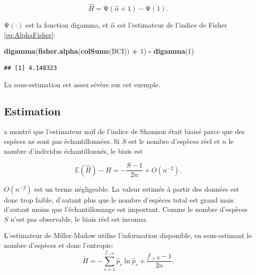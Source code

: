 \documentclass[
  11pt,
  american,
  a4paper,
  extrafontsizes,onecolumn,openright
  ]{memoir}
\newenvironment{Shaded}{\begin{snugshade}}{\end{snugshade}}
\newcommand{\DecValTok}[1]{\textcolor[rgb]{0.00,0.00,0.81}{#1}}
\newcommand{\FunctionTok}[1]{\textcolor[rgb]{0.13,0.29,0.53}{\textbf{#1}}}
\newcommand{\NormalTok}[1]{#1}
\newcommand{\SpecialCharTok}[1]{\textcolor[rgb]{0.81,0.36,0.00}{\textbf{#1}}}
\begin{document}
\begin{equation}
  \label{eq:Bulmer1974}
  \hat{H} 
  = \mathrm{\Psi} \left( \hat{\alpha} + 1 \right) - \mathrm{\Psi} \left( 1 \right).
\end{equation}

\(\mathrm{\Psi}(\cdot)\) est la fonction digamma, et \(\hat{\alpha}\) est l'estimateur de l'indice de Fisher \eqref{eq:AlphaFisher}:

\scriptsize

\begin{Shaded}
\begin{Highlighting}[]
\FunctionTok{digamma}\NormalTok{(}\FunctionTok{fisher.alpha}\NormalTok{(}\FunctionTok{colSums}\NormalTok{(BCI)) }\SpecialCharTok{+} \DecValTok{1}\NormalTok{) }\SpecialCharTok{{-}} \FunctionTok{digamma}\NormalTok{(}\DecValTok{1}\NormalTok{)}
\end{Highlighting}
\end{Shaded}

\begin{verbatim}
## [1] 4.148323
\end{verbatim}

\normalsize

La sous-estimation est assez sévère sur cet exemple.

\subsection{Estimation}\label{sec-BiaisShannon}

\textcite{Basharin1959} a montré que l'estimateur naïf de l'indice de Shannon était biaisé parce que des espèces ne sont pas échantillonnées.
Si \(S\) est le nombre d'espèces réel et \(n\) le nombre d'individus échantillonnés, le biais est

\begin{equation}
  \label{eq:Basharin1959}
  \mathbb{E}\left( \hat{H} \right) - H 
  = -\frac{S - 1}{2n} + O\left(n^{-2}\right).
\end{equation}

\(O(n^{-2})\) est un terme négligeable.
La valeur estimée à partir des données est donc trop faible, d'autant plus que le nombre d'espèces total est grand mais d'autant moins que l'échantillonnage est important.
Comme le nombre d'espèces \(S\) n'est pas observable, le biais réel est inconnu.

L'estimateur de Miller-Madow \autocite{Miller1955} utilise l'information disponible, en sous-estimant le nombre d'espèces et donc l'entropie:
\begin{equation}
  \label{eq:MillerMadow}
  \tilde{H} = -\sum^{f_{>0}}_{s=1}{\hat{p}_s \ln{\hat{p}_s}} + \frac{f_{>0} - 1}{2n}.
\end{equation}
\end{document}
